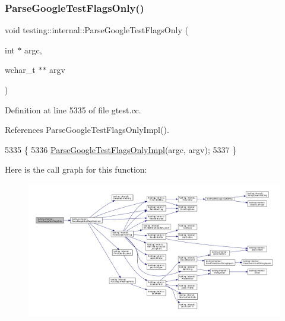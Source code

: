 \subsubsection{\texorpdfstring{Parse\+Google\+Test\+Flags\+Only()}{ParseGoogleTestFlagsOnly()}\hspace{0.1cm}{\footnotesize\ttfamily [2/2]}}
{\footnotesize\ttfamily void testing\+::internal\+::\+Parse\+Google\+Test\+Flags\+Only (\begin{DoxyParamCaption}\item[{int $\ast$}]{argc,  }\item[{wchar\+\_\+t $\ast$$\ast$}]{argv }\end{DoxyParamCaption})}



Definition at line 5335 of file gtest.\+cc.



References Parse\+Google\+Test\+Flags\+Only\+Impl().


\begin{DoxyCode}
5335                                                          \{
5336   \hyperlink{namespacetesting_1_1internal_ae4c46ce8c3d016848fff52cc5133f2ac}{ParseGoogleTestFlagsOnlyImpl}(argc, argv);
5337 \}
\end{DoxyCode}
Here is the call graph for this function\+:
\nopagebreak
\begin{figure}[H]
\begin{center}
\leavevmode
\includegraphics[width=350pt]{namespacetesting_1_1internal_aa3c81a67914856448d0778990d9d9cab_cgraph}
\end{center}
\end{figure}
\mbox{\label{namespacetesting_1_1internal_ae4c46ce8c3d016848fff52cc5133f2ac}} 
